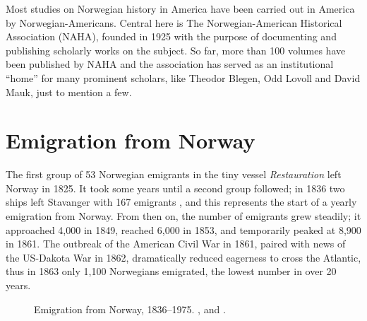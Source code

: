 \documentclass[output=paper]{langscibook}
\begin{document}
Most studies on Norwegian history in America have been carried out in America by Norwegian\hyp Americans. Central here is The Norwegian\hyp American Historical Association (NAHA), founded in 1925 with the purpose of documenting and publishing scholarly works on the subject. So far, more than 100 volumes have been published by NAHA and the association has served as an institutional “home” for many prominent scholars, like Theodor Blegen, Odd Lovoll and David Mauk, just to mention a few.

\section{Emigration from Norway}\label{sec:hjelde:2}

The first group of 53 Norwegian emigrants in the tiny vessel \textit{Restauration} left Norway in 1825. It took some years until a second group followed; in 1836 two ships left Stavanger with 167 emigrants \citep[11]{Lovoll1984}, and this represents the start of a yearly emigration from Norway. From then on, the number of emigrants grew steadily; it approached 4,000 in 1849, reached 6,000 in 1853, and temporarily peaked at 8,900 in 1861. The outbreak of the American Civil War in 1861, paired with news of the US-Dakota War in 1862, dramatically reduced eagerness to cross the Atlantic, thus in 1863 only 1,100 Norwegians emigrated, the lowest number in over 20 years. 

  
\begin{figure}
\HjeldeFigureOneData
\small
{}

\caption{Emigration from Norway, 1836--1975. \citet{Departementet1921}, \citet{statisticsnorwayBmigrations} and \citet[Table 20]{Centralbureau1969}.}
\end{figure}
\end{document}
